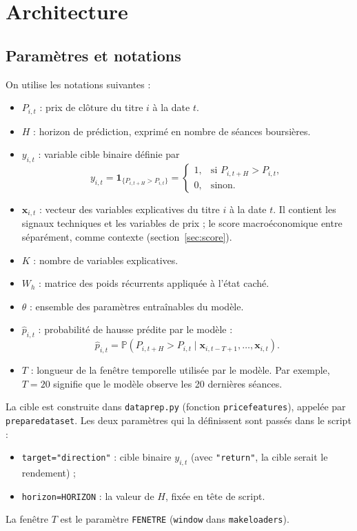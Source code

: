 \documentclass[11pt,a4paper]{article}
\renewcommand{\_}{\usorig\allowbreak}   %
\newcommand{\f}[1]{\texttt{#1}}        %
\begin{document}
\section{Architecture}
\subsection{Paramètres et notations}\label{sec:notations}
On utilise les notations suivantes :
\begin{itemize}[label=---]
  \item $P_{i,t}$ : prix de clôture du titre $i$ à la date $t$.
  \item $H$ : horizon de prédiction, exprimé en nombre de séances boursières.
  \item $y_{i,t}$ : variable cible binaire définie par
  \[
    y_{i,t} = \mathbf{1}_{\{P_{i,t+H} > P_{i,t}\}} =
    \begin{cases} 1, & \text{si } P_{i,t+H} > P_{i,t},\\ 0, & \text{sinon.} \end{cases}
  \]
  \item $\bm{x}_{i,t}$ : vecteur des variables explicatives du titre $i$ à la date $t$. Il
  contient les signaux techniques et les variables de prix ; le score macroéconomique
  entre séparément, comme contexte (section~\ref{sec:score}).
  \item $K$ : nombre de variables explicatives.
  \item $W_h$ : matrice des poids récurrents appliquée à l'état caché.
  \item $\theta$ : ensemble des paramètres entraînables du modèle.
  \item $\hat p_{i,t}$ : probabilité de hausse prédite par le modèle :
  \[
    \hat p_{i,t} = \mathbb{P}\left(P_{i,t+H} > P_{i,t} \mid \bm{x}_{i,t-T+1},\dots,\bm{x}_{i,t}\right).
  \]
  \item $T$ : longueur de la fenêtre temporelle utilisée par le modèle. Par exemple, $T=20$
  signifie que le modèle observe les 20 dernières séances.
\end{itemize}

\begin{danslecode}
La cible est construite dans \f{data\_prep.py} (fonction \f{price\_features}), appelée par
\f{prepare\_dataset}. Les deux paramètres qui la définissent sont passés dans le script :
\begin{itemize}[nosep]
  \item \f{target="direction"} : cible binaire $y_{i,t}$ (avec \f{"return"}, la cible serait le rendement) ;
  \item \f{horizon=HORIZON} : la valeur de $H$, fixée en tête de script.
\end{itemize}
La fenêtre $T$ est le paramètre \f{FENETRE} (\f{window} dans \f{make\_loaders}).
\end{danslecode}
\end{document}

